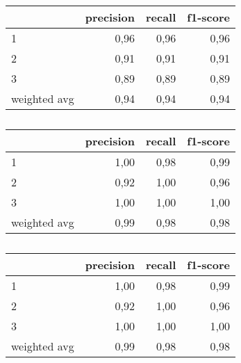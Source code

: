 \begin{table}
\centering
\caption{}%
\begin{tabular}{lrrr}
\toprule
{} &  precision &  recall &  f1-score \\
\midrule
1            &       0,96 &    0,96 &      0,96 \\
2            &       0,91 &    0,91 &      0,91 \\
3            &       0,89 &    0,89 &      0,89 \\
weighted avg &       0,94 &    0,94 &      0,94 \\
\bottomrule
\end{tabular}
\end{table}

\begin{table}
\centering
\caption{}%
\begin{tabular}{lrrr}
\toprule
{} &  precision &  recall &  f1-score \\
\midrule
1            &       1,00 &    0,98 &      0,99 \\
2            &       0,92 &    1,00 &      0,96 \\
3            &       1,00 &    1,00 &      1,00 \\
weighted avg &       0,99 &    0,98 &      0,98 \\
\bottomrule
\end{tabular}
\end{table}

\begin{table}
\centering
\caption{}%
\begin{tabular}{lrrr}
\toprule
{} &  precision &  recall &  f1-score \\
\midrule
1            &       1,00 &    0,98 &      0,99 \\
2            &       0,92 &    1,00 &      0,96 \\
3            &       1,00 &    1,00 &      1,00 \\
weighted avg &       0,99 &    0,98 &      0,98 \\
\bottomrule
\end{tabular}
\end{table}

